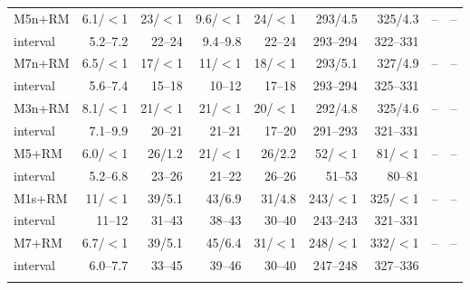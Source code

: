 \documentclass[pdflatex,sn-basic]{sn-jnl}
\begin{document}
\begin{table}[p]
\begin{tabular}{@{}lrrrrrrrr@{}}
M5n+RM & 6.1/$<$1 & 23/$<$1 & 9.6/$<$1 & 24/$<$1 & 293/4.5 & 325/4.3 & -- & -- \\
\quad interval & 5.2--7.2 & 22--24 & 9.4--9.8 & 22--24 & 293--294 & 322--331 &  & \\
M7n+RM & 6.5/$<$1 & 17/$<$1 & 11/$<$1 & 18/$<$1 & 293/5.1 & 327/4.9 & -- & -- \\
\quad interval & 5.6--7.4 & 15--18 & 10--12 & 17--18 & 293--294 & 325--331 &  & \\
M3n+RM & 8.1/$<$1 & 21/$<$1 & 21/$<$1 & 20/$<$1 & 292/4.8 & 325/4.6 & -- & -- \\
\quad interval & 7.1--9.9 & 20--21 & 21--21 & 17--20 & 291--293 & 321--331 &  & \\
M5+RM & 6.0/$<$1 & 26/1.2 & 21/$<$1 & 26/2.2 & 52/$<$1 & 81/$<$1 & -- & -- \\
\quad interval & 5.2--6.8 & 23--26 & 21--22 & 26--26 & 51--53 & 80--81 &  & \\
M1s+RM & 11/$<$1 & 39/5.1 & 43/6.9 & 31/4.8 & 243/$<$1 & 325/$<$1 & -- & -- \\
\quad interval & 11--12 & 31--43 & 38--43 & 30--40 & 243--243 & 321--331 &  & \\
M7+RM & 6.7/$<$1 & 39/5.1 & 45/6.4 & 31/$<$1 & 248/$<$1 & 332/$<$1 & -- & -- \\
\quad interval & 6.0--7.7 & 33--45 & 39--46 & 30--40 & 247--248 & 327--336 &  & \\
\botrule
\end{tabular}
\end{table}
\end{document}
